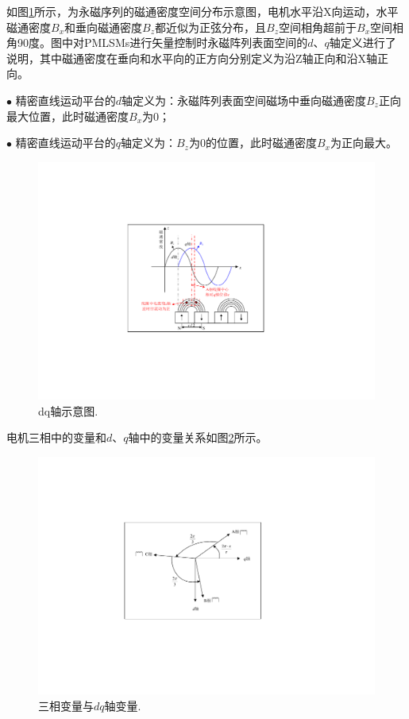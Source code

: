 如图\ref{dq轴示意图}所示，为永磁序列的磁通密度空间分布示意图，电机水平沿X向运动，水平磁通密度$B_x$和垂向磁通密度$B_z$都近似为正弦分布，且$B_z$空间相角超前于$B_x$空间相角90度。图中对PMLSMs进行矢量控制时永磁阵列表面空间的$d$、$q$轴定义进行了说明，其中磁通密度在垂向和水平向的正方向分别定义为沿Z轴正向和沿X轴正向。

	$\bullet$ 精密直线运动平台的$d$轴定义为：永磁阵列表面空间磁场中垂向磁通密度$B_z$正向最大位置，此时磁通密度$B_x$为0；
	
	$\bullet$ 精密直线运动平台的$q$轴定义为：$B_z$为0的位置，此时磁通密度$B_x$为正向最大。

\begin{figure}[H]
	\centering
	\includegraphics[width=12cm]{figures/dq轴示意图.pdf}
	\caption{dq轴示意图.}
	\label{dq轴示意图}
\end{figure}




电机三相中的变量和$d$、$q$轴中的变量关系如图\ref{三相变量与dq轴变量}所示。
\begin{figure}[H]
	\centering
	\includegraphics[width=12cm]{figures/三相变量与dq轴变量.pdf}
	\caption{三相变量与$dq$轴变量.}
	\label{三相变量与dq轴变量}
\end{figure}

